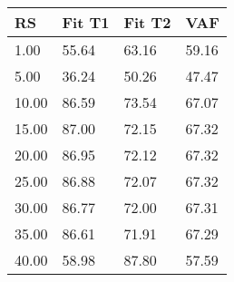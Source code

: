 \begin{tabular}{llll}
RS & Fit T1 & Fit T2 & VAF \\ 
\hline 
 1.00 & 55.64 & 63.16 & 59.16 \\ 
 5.00 & 36.24 & 50.26 & 47.47 \\ 
10.00 & 86.59 & 73.54 & 67.07 \\ 
15.00 & 87.00 & 72.15 & 67.32 \\ 
20.00 & 86.95 & 72.12 & 67.32 \\ 
25.00 & 86.88 & 72.07 & 67.32 \\ 
30.00 & 86.77 & 72.00 & 67.31 \\ 
35.00 & 86.61 & 71.91 & 67.29 \\ 
40.00 & 58.98 & 87.80 & 57.59 \\ 
\hline 
\end{tabular}